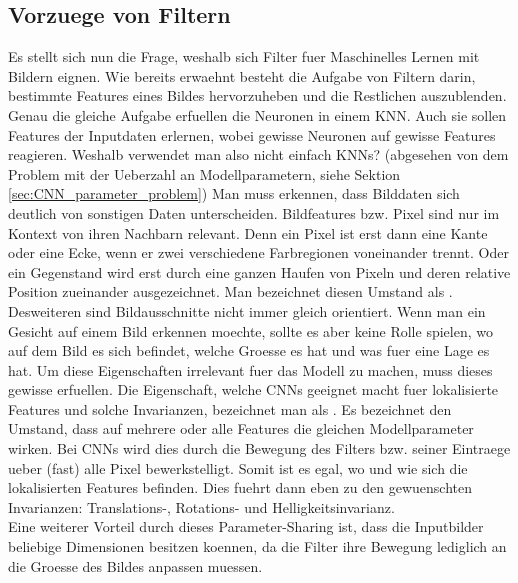 \subsection{Vorzuege von Filtern}
Es stellt sich nun die Frage, weshalb sich Filter fuer Maschinelles
Lernen mit Bildern eignen.
Wie bereits erwaehnt besteht die Aufgabe von Filtern darin, bestimmte Features
eines Bildes hervorzuheben und die Restlichen auszublenden. Genau die gleiche
Aufgabe erfuellen die Neuronen in einem KNN. Auch sie sollen Features der
Inputdaten erlernen, wobei gewisse Neuronen auf gewisse Features reagieren.
Weshalb verwendet man also nicht einfach KNNs? (abgesehen
von dem Problem mit der Ueberzahl an Modellparametern, siehe Sektion \ref{sec:CNN_parameter_problem})
\para{}
Man muss erkennen, dass Bilddaten sich deutlich von sonstigen Daten unterscheiden.
Bildfeatures bzw. Pixel sind nur im Kontext von ihren Nachbarn relevant. Denn
ein Pixel ist erst dann eine Kante oder eine Ecke, wenn er zwei verschiedene
Farbregionen voneinander trennt. Oder ein Gegenstand wird erst durch eine ganzen Haufen
von Pixeln und deren relative Position zueinander ausgezeichnet.
Man bezeichnet diesen Umstand als .
\para{}
Desweiteren sind Bildausschnitte nicht immer gleich
orientiert. Wenn man ein Gesicht auf einem Bild erkennen moechte, sollte es aber
keine Rolle spielen, wo auf dem Bild es sich befindet, welche Groesse es
hat und was fuer eine Lage es hat. Um diese Eigenschaften irrelevant fuer das
Modell zu machen, muss dieses gewisse  erfuellen.
\para{}
Die Eigenschaft, welche CNNs geeignet macht fuer lokalisierte Features und
solche Invarianzen, bezeichnet man als .
Es bezeichnet den Umstand, dass auf
mehrere oder alle Features die gleichen Modellparameter wirken. Bei CNNs wird
dies durch die Bewegung des Filters bzw. seiner Eintraege ueber (fast) alle
Pixel bewerkstelligt. Somit ist
es egal, wo und wie sich die lokalisierten Features befinden. Dies fuehrt dann eben zu
den gewuenschten Invarianzen: Translations-, Rotations- und
Helligkeitsinvarianz. \\
Eine weiterer Vorteil durch dieses Parameter-Sharing ist, dass die Inputbilder
beliebige Dimensionen besitzen koennen, da die Filter ihre Bewegung lediglich an
die Groesse des Bildes anpassen muessen.

\cite{deeplearning.ai:cnn}

